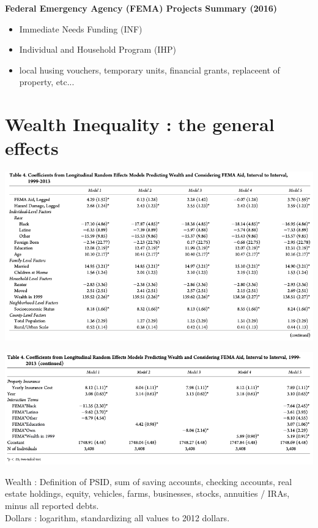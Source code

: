 \documentclass{beamer}
\begin{document}
\begin{frame}{\subsecname}
    \textbf{Federal Emergency Agency (FEMA) Projects Summary (2016)}
    \begin{itemize}
        \item Immediate Needs Funding (INF)
        \item Individual and Household Program (IHP)
        \item local husing vouchers, temporary units, financial grants, replaceent of property, etc...
    \end{itemize}
\end{frame}

\section{Wealth Inequality : the general effects}

    \begin{frame}{\secname}
        \includegraphics[totalheight=7cm,width=1\textwidth]{pictures/Table_4_1.png}
    \end{frame}

    \begin{frame}{\secname}
        \includegraphics[width=1\textwidth]{pictures/Table_4_2.png}
    \end{frame}

    \begin{frame}{\secname}
        Wealth : Definition of PSID, sum of saving accounts, checking accounts, real estate holdings, equity, vehicles,
        farms, businesses, stocks, annuities / IRAs, minus all reported debts.
        \\ Dollars : logarithm, standardizing all values to 2012 dollars. 
    \end{frame}
\end{document}
